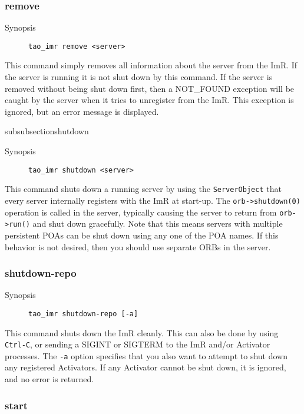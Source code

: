 \subsubsection{remove}

\begin{description}
    \item [Synopsis] {\tt tao\_imr remove <server>}
\end{description}

This command simply removes all information about the server from the ImR.
If the server is running it is not shut down by this command. If the server is
removed without being shut down first, then a NOT\_FOUND exception will
be caught by the server when it tries to unregister from the ImR. This exception
is ignored, but an error message is displayed.

subsubsection{shutdown}

\begin{description}
    \item [Synopsis] {\tt tao\_imr shutdown <server>}
\end{description}

This command shuts down a running server by using the {\tt ServerObject}
that every server internally registers with the ImR at start-up. The
{\tt orb->shutdown(0)} operation is called in the server, typically causing
the server to return from {\tt orb->run()} and shut down gracefully. Note
that this means servers with multiple persistent POAs can be shut down
using any one of the POA names. If this behavior is not desired, then you
should use separate ORBs in the server.

\subsubsection{shutdown-repo}

\begin{description}
    \item [Synopsis] {\tt tao\_imr shutdown-repo [-a]}
\end{description}

This command shuts down the ImR cleanly. This can also be done by
using {\tt Ctrl-C}, or sending a SIGINT or SIGTERM to the ImR and/or
Activator processes.   The {\tt -a} option specifies that you also want to
 attempt to shut down any registered Activators. If any Activator
cannot be shut down, it is ignored, and no error is returned.

\subsubsection{start}

